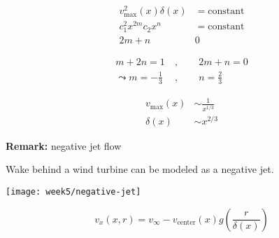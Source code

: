 \begin{align}
v_\mathrm{max}^2(x)\delta(x)&=\mathrm{constant}\\
c_1^2x^{2m}c_2x^n &= \mathrm{constant}\\
2m+n&0
\end{align}

\begin{align}
m+2n=1\ &,\qquad 2m+n=0 \\
\leadsto
m=-\frac{1}{3}\ &,\qquad n=\frac{2}{3}
\end{align}

\begin{align}
v_\mathrm{max}(x)&\sim\frac{1}{x^{1/3}}\\
\delta(x)&\sim x^{2/3}
\end{align}

\begin{framed}
\textbf{Remark:} negative jet flow

Wake behind a wind turbine can be modeled as a negative jet.

{\center
\texttt{[image: week5/negative-jet]}\\
}

\begin{equation}
v_x(x,r) = v_\infty-v_\mathrm{center}(x)g\left(\frac{r}{\delta(x)}\right)
\end{equation}
\end{framed}